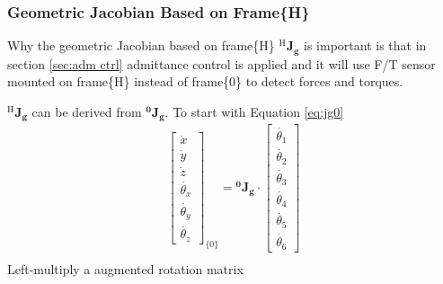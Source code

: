 \subsubsection{Geometric Jacobian Based on Frame\{H\}}
\label{sec:jg6}
\hspace*{6mm}Why the geometric Jacobian based on frame\{H\} $^{\mathrm{H}}\!\mathbf{J_g}$ is important is that in section \ref{sec:adm ctrl} admittance control is applied and it will use F/T sensor mounted on frame\{H\} instead of frame\{0\} to detect forces and torques. 
\par
$^{\mathrm{H}}\!\mathbf{J_g}$ can be derived from $\mathbf{^0\!J_g}$. To start with Equation \ref{eq:jg0}
\begin{equation}
\begin{split}
\begin{bmatrix}
\dot{x}\\
\dot{y}\\
\dot{z}\\
\dot{\theta _x}\\
\dot{\theta _y}\\
\dot{\theta _z}
\end{bmatrix}_{\!\{0\}}
=
\mathbf{^0\!J_g} \cdot 
\begin{bmatrix}
\dot{\theta _1} \\ 
\dot{\theta _2} \\ 
\dot{\theta _3} \\ 
\dot{\theta _4} \\ 
\dot{\theta _5} \\ 
\dot{\theta _6} 
\end{bmatrix}\\
\end{split}
\end{equation}
Left-multiply a augmented rotation matrix 
